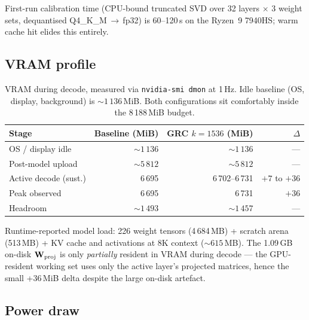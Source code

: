 \documentclass[11pt]{article}
\begin{document}
First-run calibration time (CPU-bound truncated SVD over 32 layers $\times$
3 weight sets, dequantised Q4\_K\_M\,$\to$\,fp32) is 60--120\,s on the
Ryzen~9 7940HS; warm cache hit elides this entirely.

\subsection{VRAM profile}

\begin{table}[h]\centering\footnotesize
\caption{VRAM during decode, measured via \texttt{nvidia-smi dmon} at 1\,Hz.
Idle baseline (OS, display, background) is ${\sim}1\,136$\,MiB. Both
configurations sit comfortably inside the 8\,188\,MiB budget.}
\begin{tabular}{@{}lrrr@{}}
\toprule
\textbf{Stage} & \textbf{Baseline (MiB)} & \textbf{GRC $k{=}1536$ (MiB)} & $\Delta$ \\
\midrule
OS / display idle      & ${\sim}1\,136$        & ${\sim}1\,136$        & ---\\
Post-model upload      & ${\sim}5\,812$        & ${\sim}5\,812$        & ---\\
Active decode (sust.)  & 6\,695                & 6\,702--6\,731        & $+7$ to $+36$\\
Peak observed          & 6\,695                & 6\,731                & $+36$\\
Headroom               & ${\sim}1\,493$        & ${\sim}1\,457$        & ---\\
\bottomrule
\end{tabular}
\end{table}

Runtime-reported model load: 226 weight tensors (4\,684\,MB) +
scratch arena (513\,MB) + KV cache and activations at 8K context
(${\sim}615$\,MB). The 1.09\,GB on-disk $\mathbf{W}_\text{proj}$ is only
\emph{partially} resident in VRAM during decode --- the GPU-resident working
set uses only the active layer's projected matrices, hence the small +36\,MiB
delta despite the large on-disk artefact.

\subsection{Power draw}
\end{document}
